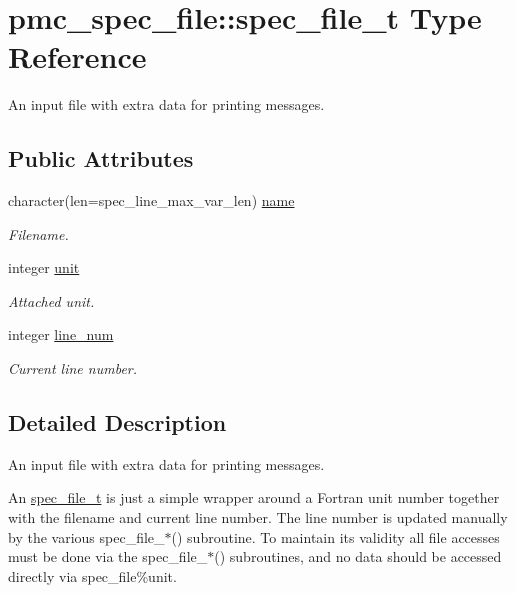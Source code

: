 \hypertarget{structpmc__spec__file_1_1spec__file__t}{}\section{pmc\+\_\+spec\+\_\+file\+:\+:spec\+\_\+file\+\_\+t Type Reference}
\label{structpmc__spec__file_1_1spec__file__t}


An input file with extra data for printing messages.  


\subsection*{Public Attributes}
\begin{DoxyCompactItemize}
\item 
character(len=spec\+\_\+line\+\_\+max\+\_\+var\+\_\+len) \mbox{\hyperlink{structpmc__spec__file_1_1spec__file__t_aae425ae4a0fe080faabc5f0441d12768}{name}}
\begin{DoxyCompactList}\small\item\em Filename. \end{DoxyCompactList}\item 
integer \mbox{\hyperlink{structpmc__spec__file_1_1spec__file__t_a32be05bc5fbc0ae707af581265f957d4}{unit}}
\begin{DoxyCompactList}\small\item\em Attached unit. \end{DoxyCompactList}\item 
integer \mbox{\hyperlink{structpmc__spec__file_1_1spec__file__t_a636cdadfaecfe4ae67981136a9f3e882}{line\+\_\+num}}
\begin{DoxyCompactList}\small\item\em Current line number. \end{DoxyCompactList}\end{DoxyCompactItemize}


\subsection{Detailed Description}
An input file with extra data for printing messages. 

An \mbox{\hyperlink{structpmc__spec__file_1_1spec__file__t}{spec\+\_\+file\+\_\+t}} is just a simple wrapper around a Fortran unit number together with the filename and current line number. The line number is updated manually by the various {\ttfamily spec\+\_\+file\+\_\+$\ast$}() subroutine. To maintain its validity all file accesses must be done via the {\ttfamily spec\+\_\+file\+\_\+$\ast$}() subroutines, and no data should be accessed directly via {\ttfamily spec\+\_\+file\%unit}. 

